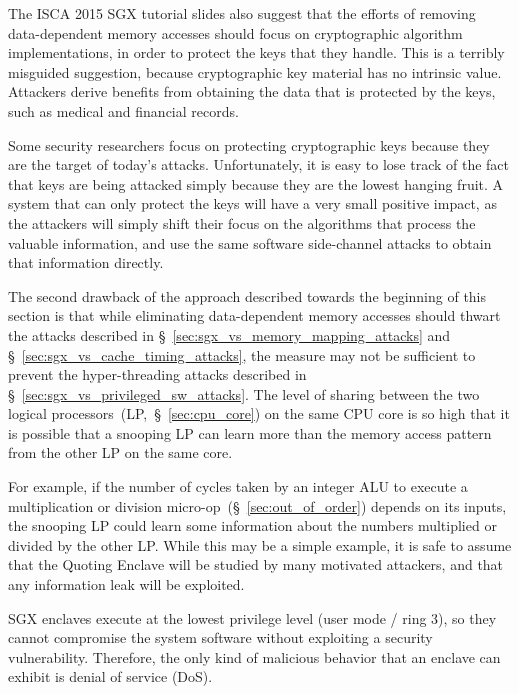 The ISCA 2015 SGX tutorial slides also suggest that the efforts of removing
data-dependent memory accesses should focus on cryptographic algorithm
implementations, in order to protect the keys that they handle. This is a
terribly misguided suggestion, because cryptographic key material has no
intrinsic value. Attackers derive benefits from obtaining the data that is
protected by the keys, such as medical and financial records.

Some security researchers focus on protecting cryptographic keys because they
are the target of today's attacks. Unfortunately, it is easy to lose track of
the fact that keys are being attacked simply because they are the lowest
hanging fruit. A system that can only protect the keys will have a very small
positive impact, as the attackers will simply shift their focus on the
algorithms that process the valuable information, and use the same software
side-channel attacks to obtain that information directly.

The second drawback of the approach described towards the beginning of this
section is that while eliminating data-dependent memory accesses should
thwart the attacks described in \S~\ref{sec:sgx_vs_memory_mapping_attacks} and
\S~\ref{sec:sgx_vs_cache_timing_attacks}, the measure may not be sufficient to
prevent the hyper-threading attacks described in
\S~\ref{sec:sgx_vs_privileged_sw_attacks}. The level of sharing between the two
logical processors~(LP,~\S~\ref{sec:cpu_core}) on the same CPU core is so high
that it is possible that a snooping LP can learn more than the memory access
pattern from the other LP on the same core.

For example, if the number of cycles taken by an integer ALU to execute a
multiplication or division micro-op~(\S~\ref{sec:out_of_order}) depends on its
inputs, the snooping LP could learn some information about the numbers
multiplied or divided by the other LP. While this may be a simple example, it
is safe to assume that the Quoting Enclave will be studied by many motivated
attackers, and that any information leak will be exploited.



SGX enclaves execute at the lowest privilege level (user mode / ring 3), so
they cannot compromise the system software without exploiting a security
vulnerability. Therefore, the only kind of malicious behavior that an enclave
can exhibit is denial of service (DoS).

